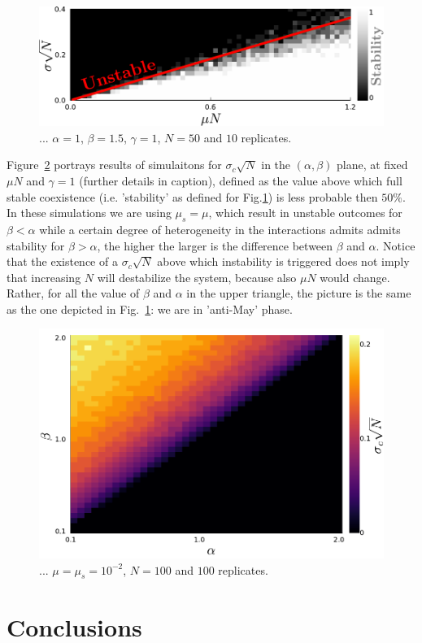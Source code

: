 \documentclass[%
 reprint,
 amsmath,amssymb,
 aps,
]{revtex4-2}
\begin{document}
\begin{figure}[h!]
    \centering
    \includegraphics[width=.45\textwidth]{figs/beta1_5-S50-N10-diversity.pdf}
    \caption{... $\alpha=1$, $\beta=1.5$,
    $\gamma=1$, $N=50$ and $10$ replicates.}
    \label{fig: stability line + sims}
\end{figure}

Figure~\ref{fig: alpha-beta} portrays results of simulaitons 
for $\sigma_c\sqrt{N}$ in the $(\alpha,\beta)$ plane, 
at fixed $\mu N$ and $\gamma = 1$ (further details in caption), 
defined as the value above which
full stable coexistence (i.e. 'stability'
as defined for Fig.\ref{fig: stability line + sims}) 
is less probable then $50\%$.
In these simulations we are using $\mu_s = \mu$, which result
in unstable outcomes for $\beta<\alpha$ while
a certain degree of heterogeneity in the interactions
admits admits stability for $\beta>\alpha$, the higher
the larger is the difference between $\beta$ and $\alpha$.
Notice that the existence of a $\sigma_c\sqrt{N}$ above which
instability is triggered does not imply that increasing $N$ will
destabilize the system, because also $\mu N$ would change.
Rather, for all the value of $\beta$ and $\alpha$ in the
upper triangle, the picture is the same as the one depicted in 
Fig.~\ref{fig: stability line + sims}: we are in 'anti-May'
phase.

\begin{figure}[h!]
    \centering
    \includegraphics[width=.45\textwidth]{figs/alpha-beta.pdf}
    \caption{...
    $\mu=\mu_s=10^{-2}$, $N=100$ and $100$ replicates.}
    \label{fig: alpha-beta}
\end{figure}
    
\section{Conclusions}
\end{document}
